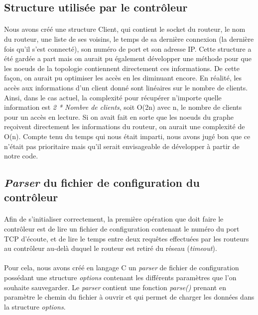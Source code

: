 \subsection{Structure utilisée par le contrôleur}
\paragraph{}Nous avons créé une structure Client, qui contient le socket du routeur, le nom du routeur, une liste de ses voisins, le temps de sa dernière connexion (la dernière fois qu'il s'est connecté), son numéro de port et son adresse IP. Cette structure a été gardée a part mais on aurait pu également développer une méthode pour que les noeuds de la topologie contiennent directement ces informations. De cette façon, on aurait pu optimiser les accès en les diminuant encore. En réalité, les accès aux informations d'un client donné sont linéaires sur le nombre de clients. Ainsi, dans le cas actuel, la complexité pour récupérer n'importe quelle information est \textit{2 * Nombre de clients}, soit O(2n) avec n, le nombre de clients pour un accès en lecture. Si on avait fait en sorte que les noeuds du graphe reçoivent directement les informations du routeur, on aurait une complexité de O(n). Compte tenu du temps qui nous était imparti, nous avons jugé bon que ce n'était pas prioritaire mais qu'il serait envisageable de développer à partir de notre code.

\subsection{\textit{Parser} du fichier de configuration du contrôleur}
\paragraph{}Afin de s'initialiser correctement, la première opération que doit faire le
contrôleur est de lire un fichier de configuration contenant le numéro
du port TCP d'écoute, et de lire le temps entre deux requêtes effectuées par les
routeurs au contrôleur au-delà duquel le routeur est retiré du réseau
(\textit{timeout}).
\paragraph{}Pour cela, nous avons créé  en langage C un \textit{parser} de fichier de configuration possédant une structure \textit{options} contenant les différents paramètres que l'on souhaite sauvegarder. Le \textit{parser} contient une fonction \textit{parse()} prenant en paramètre le chemin du fichier à ouvrir et qui permet de charger les données dans la structure \textit{options}.
